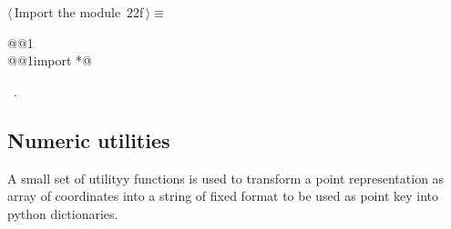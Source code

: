 \documentclass[11pt,oneside]{article}	%
\begin{document}
\begin{flushleft} \small \label{scrap47}
\protect{}$\langle\,$Import the module\nobreak\ {\footnotesize 22f}$\,\rangle\equiv$
\vspace{-1ex}
\begin{list}{}{} \item
\mbox{}\verb@import @@1\verb@@\\
\mbox{}\verb@from @@1\verb@ import *@\\
\mbox{}\verb@@{\NWsep}
\end{list}
\vspace{-1ex}
\footnotesize\addtolength{\baselineskip}{-1ex}
\begin{list}{}{\setlength{\itemsep}{-\parsep}\setlength{\itemindent}{-\leftmargin}}
\item \NWtxtMacroRefIn\ .
\end{list}
\end{flushleft}


\subsection{Numeric utilities}

A small set of utilityy functions is used to transform a point representation as array of coordinates into a string of fixed format to be used as point key into python dictionaries.
\end{document}
